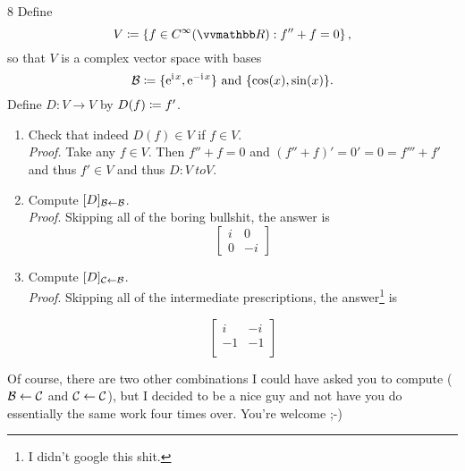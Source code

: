 \documentclass{exercises}
\begin{document}
\begin{exr}{}{8}
	Define
	\begin{equation*}
		V\ceqq \left\{ f\in C^{\infty}(\R ):f''+f=0\right\} ,
	\end{equation*}
	so that $V$ is a complex vector space with bases
	\begin{equation*}
		\basis{B}\ceqq \{ \e ^{\im x},\e ^{-\im x}\} \text{ and }\{ \cos (x),\sin (x)\} .
	\end{equation*}
	Define $D\colon V\rightarrow V$ by $D(f)\coloneqq f'$.
	\begin{enumerate}
		\item Check that indeed $D(f)\in V$ if $f\in V$. \\
		\emph{Proof.} Take any $f \in V$. Then $f'' + f = 0$ and $(f'' + f)' = 0' = 0 = f''' + f'$ and thus $f' \in V$ and thus $D: V\ to V$.
		\item Compute $[D]_{\basis{B}\leftarrow \basis{B}}$. \\
		\emph{Proof}. Skipping all of the boring bullshit, the answer is
		\begin{equation*}
			\begin{bmatrix}
				i & 0 \\
				0 & -i
			\end{bmatrix}
		\end{equation*}

		\item Compute $[D]_{\basis{C}\leftarrow \basis{B}}$. \\
		\emph{Proof}. Skipping all of the intermediate prescriptions, the answer\footnote{I didn't google this shit.} is 

		\begin{equation*}
			\begin{bmatrix}
				i & -i \\
				-1 & -1 \\
			\end{bmatrix}
		\end{equation*}


	\end{enumerate}
	\begin{rmk}
		Of course, there are two other combinations I could have asked you to compute ($\basis{B}\leftarrow \basis{C}$ and $\basis{C}\leftarrow \basis{C}$), but I decided to be a nice guy and not have you do essentially the same work four times over.  You're welcome ;-)
	\end{rmk}
\end{exr}
\end{document}
